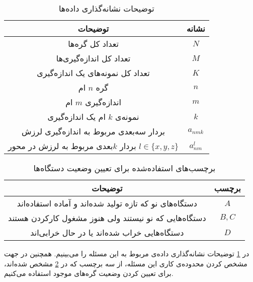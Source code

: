 \begin{table}[h!]
  \begin{center}
    \caption{توضیحات نشانه‌گذاری داده‌ها}
    \label{table:notation_description}
    \begin{tabular}{|c|c|} %
    	\hline
\textbf{توضیحات} & \textbf{نشانه}\\
    	\hline \hline
تعداد کل گره‌ها & $N$\\
    	\hline
 تعداد کل اندازه‌گیری‌ها & $M$\\
    	\hline
   تعداد کل نمونه‌های یک اندازه‌گیری & $K$\\
    	\hline
گره $n$ ام & $n$\\
 	\hline
اندازه‌گیری $m$ ام & $m$\\
 	\hline
نمونه‌ی $k$ ام یک اندازه‌گیری & $k$\\
 	\hline
بردار سه‌بعدی مربوط به اندازه‌گیری لرزش & $a_{nmk}$\\
 	\hline
بردار $k$بعدی مربوط به لرزش در محور $l \in \{x, y, z\}$  & $a^l_{nm}$\\
 	\hline
    \end{tabular}
  \end{center}
\end{table} 

\begin{table}[h!]
  \begin{center}
    \caption{برچسب‌های استفاده‌شده برای تعیین وضعیت دستگاه‌ها}
    \label{table:node_state_labels}
    \begin{tabular}{|c|c|} %
    	\hline
\textbf{توضیحات} & \textbf{برچسب}\\
    	\hline \hline
دستگاه‌های نو که تازه تولید شده‌اند و آماده استفاده‌اند & $A$\\
    	\hline
دستگاه‌هایی که نو نیستند ولی هنوز مشغول کارکردن هستند & $B, C$\\
    	\hline
  دستگاه‌هایی خراب‌ شده‌اند یا در حال خرابی‌اند & $D$\\
    	\hline
    \end{tabular}
  \end{center}
\end{table}

در \cref{table:notation_description} توضیحات نشانه‌گذاری داده‌ی مربوط به این مسئله را می‌بینیم. همچنین در جهت مشخص کردن محدوده‌ی کاری این مسئله، از سه برچسب که در \cref{table:node_state_labels} مشخص شده‌اند، برای تعیین کردن وضعیت گره‌های موجود استفاده می‌کنیم.

